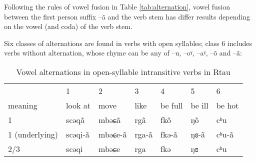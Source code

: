 \documentclass[oneside,a4paper,11pt]{article}
\newcommand{\ipa}[1]{{\phon #1}} %
\begin{document}
Following the rules of  vowel fusion in Table \ref{tab:alternation}, vowel fusion between the first person suffix \ipa{--ã} and the verb stem has differ results depending on the vowel (and coda) of the verb stem. 
 
Six classes of alternations are found in verbs with open syllables; class 6 includes verbs without alternation, whose rhyme can be any of --\ipa{u}, --\ipa{oˠ}, --\ipa{aˠ}, --\ipa{õ} and --\ipa{ã}:
\begin{table}[H]
\caption{Vowel alternations in open-syllable intransitive verbs in Rtau} \label{tab:open.intr} \centering
\begin{tabular}{llll|ll|l}
\toprule
&1&2&3&4&5&6 \\
meaning &	look at   &  	move   &  	like&  	be full     &  	 	be ill      &  	be hot       \\  
\midrule
1&	\ipa{scəqã} & 	\ipa{mbəɕã} & \ipa{rgã} &	\ipa{fkõ} & 	  	\ipa{ŋõ} & 	   	\ipa{cʰu}   \\ 
1 (underlying)&	\ipa{scəqi-ã} & 	\ipa{mbəɕe-ã} & \ipa{rga-ã} &	\ipa{fkə-ã} & 	  	\ipa{ŋɞ-ã} & 	   	\ipa{cʰu-ã}   \\ 
2/3&	\ipa{scəqi} & 	\ipa{mbəɕe} & \ipa{rga} & 	\ipa{fkə} & 	  	\ipa{ŋɞ} & 	 	\ipa{cʰu}  \\ 
\bottomrule
\end{tabular}
\end{table}
\end{document}
